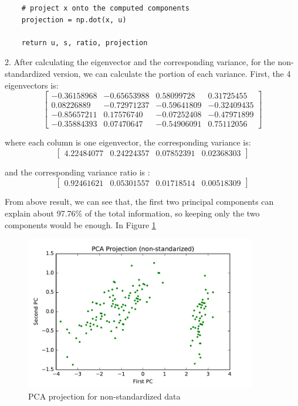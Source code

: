 \begin{description}
\begin{lstlisting}
    # project x onto the computed components
    projection = np.dot(x, u)
    
    return u, s, ratio, projection
\end{lstlisting}

\item{2. }
After calculating the eigenvector and the corresponding variance, for the non-standardized version, we can calculate the portion of each variance.
First, the 4 eigenvectors is:
$$
\begin{bmatrix}
 -0.36158968 & -0.65653988 &  0.58099728 &  0.31725455 \\
  0.08226889 & -0.72971237 & -0.59641809 & -0.32409435 \\
 -0.85657211 &  0.17576740 & -0.07252408 & -0.47971899 \\
 -0.35884393 &  0.07470647 & -0.54906091 &  0.75112056
\end{bmatrix}
$$ 

where each column is one eigenvector, the corresponding variance is:
$$\begin{bmatrix}
4.22484077 & 0.24224357 & 0.07852391 & 0.02368303
\end{bmatrix}$$

and the corresponding variance ratio is :
$$\begin{bmatrix}
0.92461621 & 0.05301557 & 0.01718514 & 0.00518309
\end{bmatrix}$$

From above result, we can see that, the first two principal components can explain about 97.76\% of the total information, so keeping only the two components would be enough. In Figure \ref{fig:pca_1}

\begin{figure}[H]
\centering
\includegraphics[width=0.9\textwidth]{./figures/projection1.pdf}
\caption{\label{fig:pca_1} PCA projection for non-standardized data}
\end{figure}


\end{description}
